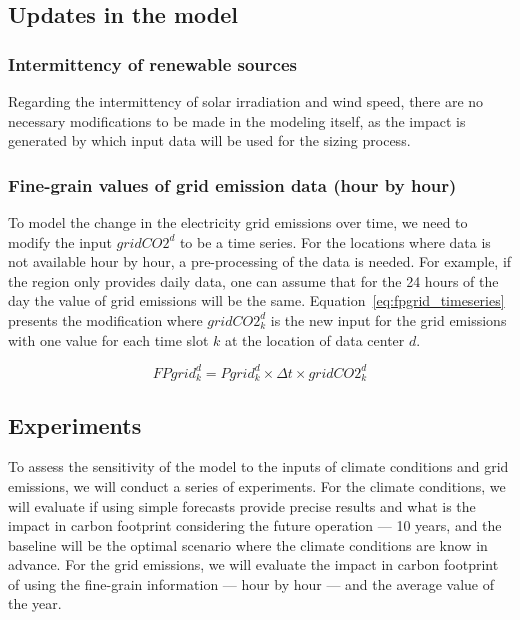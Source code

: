 \subsection{Updates in the model}

\subsubsection{Intermittency of renewable sources}

Regarding the intermittency of solar irradiation and wind speed, there are no necessary modifications to be made in the modeling itself, as the impact is generated by which input data will be used for the sizing process.

\subsubsection{Fine-grain values of grid emission data (hour by hour)}

To model the change in the electricity grid emissions over time, we need to modify the input $gridCO2^d$ to be a time series. For the locations where data is not available hour by hour, a pre-processing of the data is needed. For example, if the region only provides daily data, one can assume that for the 24 hours of the day the value of grid emissions will be the same. Equation~\eqref{eq:fpgrid_timeseries} presents the modification where $gridCO2^d_k$ is the new input for the grid emissions with one value for each time slot $k$ at the location of data center $d$.


\begin{equation} \label{eq:fpgrid_timeseries}
FPgrid_k^d = Pgrid_k^d\times \Delta t \times gridCO2^d_k
\end{equation}

\subsection{Experiments}

To assess the sensitivity of the model to the inputs of climate conditions and grid emissions, we will conduct a series of experiments. For the climate conditions, we will evaluate if using simple forecasts provide precise results and what is the impact in carbon footprint considering the future operation --- 10 years, and the baseline will be the optimal scenario where the climate conditions are know in advance. For the grid emissions, we will evaluate the impact in carbon footprint of using the fine-grain information --- hour by hour --- and the average value of the year.



